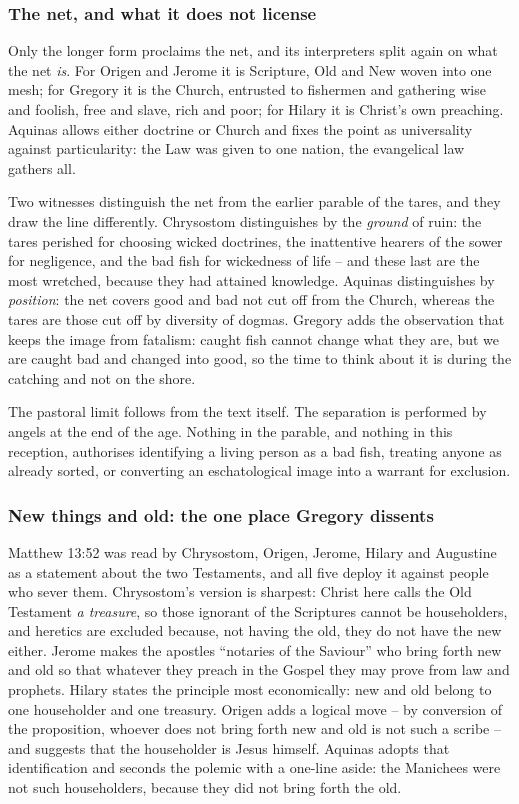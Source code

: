 \subsubsection*{The net, and what it does not license}

Only the longer form proclaims the net, and its interpreters split again on what the net \emph{is}. For Origen and Jerome it is Scripture, Old and New woven into one mesh; for Gregory it is the Church, entrusted to fishermen and gathering wise and foolish, free and slave, rich and poor; for Hilary it is Christ's own preaching. Aquinas allows either doctrine or Church and fixes the point as universality against particularity: the Law was given to one nation, the evangelical law gathers all.

Two witnesses distinguish the net from the earlier parable of the tares, and they draw the line differently. Chrysostom distinguishes by the \emph{ground} of ruin: the tares perished for choosing wicked doctrines, the inattentive hearers of the sower for negligence, and the bad fish for wickedness of life -- and these last are the most wretched, because they had attained knowledge. Aquinas distinguishes by \emph{position}: the net covers good and bad not cut off from the Church, whereas the tares are those cut off by diversity of dogmas. Gregory adds the observation that keeps the image from fatalism: caught fish cannot change what they are, but we are caught bad and changed into good, so the time to think about it is during the catching and not on the shore.

The pastoral limit follows from the text itself. The separation is performed by angels at the end of the age. Nothing in the parable, and nothing in this reception, authorises identifying a living person as a bad fish, treating anyone as already sorted, or converting an eschatological image into a warrant for exclusion.

\subsubsection*{New things and old: the one place Gregory dissents}

Matthew 13:52 was read by Chrysostom, Origen, Jerome, Hilary and Augustine as a statement about the two Testaments, and all five deploy it against people who sever them. Chrysostom's version is sharpest: Christ here calls the Old Testament \emph{a treasure}, so those ignorant of the Scriptures cannot be householders, and heretics are excluded because, not having the old, they do not have the new either. Jerome makes the apostles ``notaries of the Saviour'' who bring forth new and old so that whatever they preach in the Gospel they may prove from law and prophets. Hilary states the principle most economically: new and old belong to one householder and one treasury. Origen adds a logical move -- by conversion of the proposition, whoever does not bring forth new and old is not such a scribe -- and suggests that the householder is Jesus himself. Aquinas adopts that identification and seconds the polemic with a one-line aside: the Manichees were not such householders, because they did not bring forth the old.

